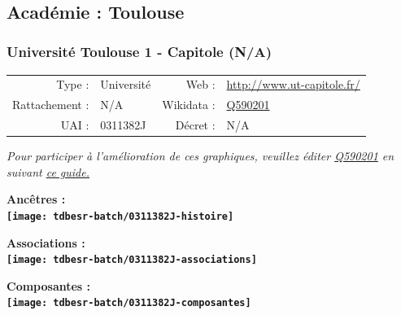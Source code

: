 \documentclass[12pt,french,]{article}
\begin{document}
\ifoddpage \fi ~\newpage  

\hypertarget{acaduxe9mie-toulouse}{%
\subsection{Académie : Toulouse}\label{acaduxe9mie-toulouse}}

\hypertarget{universituxe9-toulouse-1---capitole-na}{%
\subsubsection{Université Toulouse 1 - Capitole
(N/A)}\label{universituxe9-toulouse-1---capitole-na}}

\begin{tabular*}{\textwidth}{rp{5cm}rl}  
\hline  
Type : & Université & Web : &\href{http://www.ut-capitole.fr/}{http://www.ut-capitole.fr/} \\  
Rattachement : & N/A & Wikidata : & \href{https://www.wikidata.org/entity/Q590201}{Q590201} \\  
UAI : & 0311382J & Décret : & N/A \\  
\hline  
\end{tabular*}

\textit{\scriptsize Pour participer à l'amélioration de ces graphiques, veuillez éditer  \href{https://www.wikidata.org/entity/Q590201}{Q590201}  en suivant \href{https://github.com/cpesr/wikidataESR/blob/master/Rmd/wikidataESR.md}{ce guide.}}

\vspace{1cm}  
\begin{minipage}[b]{0.50\textwidth}\begin{center} \bf Ancêtres : \\  
\texttt{[image: tdbesr-batch/0311382J-histoire]} \end{center}\end{minipage}\begin{minipage}[b]{0.50\textwidth}\begin{center} \bf Associations : \\  
\texttt{[image: tdbesr-batch/0311382J-associations]} \end{center}\end{minipage}

\hrulefill

\begin{center} \bf Composantes : \\  
\texttt{[image: tdbesr-batch/0311382J-composantes]} \end{center}
\end{document}
